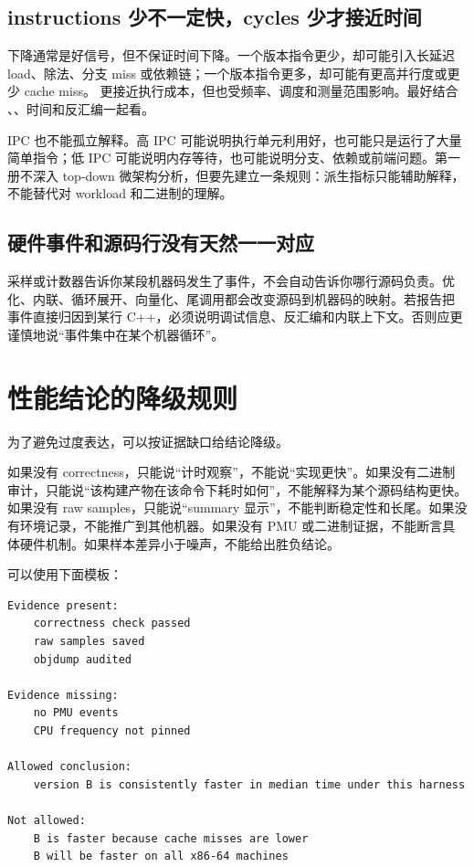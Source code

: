 \subsection{instructions 少不一定快，cycles 少才接近时间}

 下降通常是好信号，但不保证时间下降。一个版本指令更少，却可能引入长延迟 load、除法、分支 miss 或依赖链；一个版本指令更多，却可能有更高并行度或更少 cache miss。  更接近执行成本，但也受频率、调度和测量范围影响。最好结合 、、时间和反汇编一起看。

IPC 也不能孤立解释。高 IPC 可能说明执行单元利用好，也可能只是运行了大量简单指令；低 IPC 可能说明内存等待，也可能说明分支、依赖或前端问题。第一册不深入 top-down 微架构分析，但要先建立一条规则：派生指标只能辅助解释，不能替代对 workload 和二进制的理解。

\subsection{硬件事件和源码行没有天然一一对应}

采样或计数器告诉你某段机器码发生了事件，不会自动告诉你哪行源码负责。优化、内联、循环展开、向量化、尾调用都会改变源码到机器码的映射。若报告把  事件直接归因到某行 C++，必须说明调试信息、反汇编和内联上下文。否则应更谨慎地说“事件集中在某个机器循环”。

\section{性能结论的降级规则}

为了避免过度表达，可以按证据缺口给结论降级。

如果没有 correctness，只能说“计时观察”，不能说“实现更快”。如果没有二进制审计，只能说“该构建产物在该命令下耗时如何”，不能解释为某个源码结构更快。如果没有 raw samples，只能说“summary 显示”，不能判断稳定性和长尾。如果没有环境记录，不能推广到其他机器。如果没有 PMU 或二进制证据，不能断言具体硬件机制。如果样本差异小于噪声，不能给出胜负结论。

可以使用下面模板：

\begin{lstlisting}
Evidence present:
    correctness check passed
    raw samples saved
    objdump audited

Evidence missing:
    no PMU events
    CPU frequency not pinned

Allowed conclusion:
    version B is consistently faster in median time under this harness

Not allowed:
    B is faster because cache misses are lower
    B will be faster on all x86-64 machines
\end{lstlisting}

